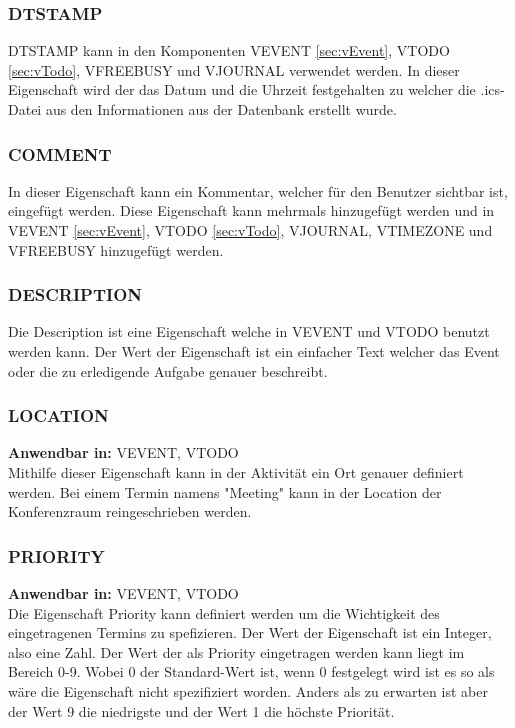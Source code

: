 \subsubsection{DTSTAMP}
\label{sec:dtstamp}
DTSTAMP kann in den Komponenten VEVENT \ref{sec:vEvent}, VTODO \ref{sec:vTodo}, VFREEBUSY und VJOURNAL verwendet werden. In dieser Eigenschaft wird der das Datum und die Uhrzeit festgehalten zu welcher die .ics-Datei aus den Informationen aus der Datenbank erstellt wurde.
\subsubsection{COMMENT}
\label{sec:comment}
In dieser Eigenschaft kann ein Kommentar, welcher für den Benutzer sichtbar ist, eingefügt werden. Diese Eigenschaft kann mehrmals hinzugefügt werden und in VEVENT \ref{sec:vEvent}, VTODO \ref{sec:vTodo}, VJOURNAL, VTIMEZONE und VFREEBUSY hinzugefügt werden.
\subsubsection{DESCRIPTION}
\label{sec:description}
Die Description ist eine Eigenschaft welche in VEVENT und VTODO benutzt werden kann. Der Wert der Eigenschaft ist ein einfacher Text welcher das Event oder die zu erledigende Aufgabe genauer beschreibt.  
\subsubsection{LOCATION}
\label{sec:location}
\textbf{Anwendbar in:} VEVENT, VTODO \\ %
Mithilfe dieser Eigenschaft kann in der Aktivität ein Ort genauer definiert werden. Bei einem Termin namens "Meeting" kann in der Location der Konferenzraum reingeschrieben werden. 
\subsubsection{PRIORITY}
\label{sec:priority}
\textbf{Anwendbar in:} VEVENT, VTODO \\
Die Eigenschaft Priority kann definiert werden um die Wichtigkeit des eingetragenen Termins zu spefizieren. Der Wert der Eigenschaft ist ein Integer, also eine Zahl. Der Wert der als Priority eingetragen werden kann liegt im Bereich 0-9. Wobei 0 der Standard-Wert ist, wenn 0 festgelegt wird ist es so als wäre die Eigenschaft nicht spezifiziert worden. Anders als zu erwarten ist aber der Wert 9 die niedrigste und der Wert 1 die höchste Priorität. 
